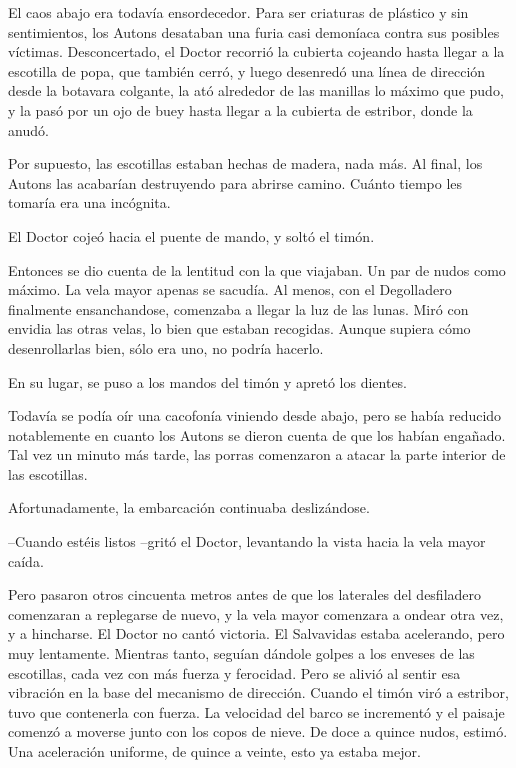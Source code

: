 El caos abajo era todavía ensordecedor. Para ser criaturas de plástico y sin sentimientos, los Autons desataban una furia casi demoníaca contra sus posibles víctimas. Desconcertado, el Doctor recorrió la cubierta cojeando hasta llegar a la escotilla de popa, que también cerró, y luego desenredó una línea de dirección desde la botavara colgante, la ató alrededor de las manillas lo máximo que pudo, y la pasó por un ojo de buey hasta llegar a la cubierta de estribor, donde la anudó.
 
Por supuesto, las escotillas estaban hechas de madera, nada más. Al final, los Autons las acabarían destruyendo para abrirse camino. Cuánto tiempo les tomaría era una incógnita.
 
El Doctor cojeó hacia el puente de mando, y soltó el timón.
 
Entonces se dio cuenta de la lentitud con la que viajaban. Un par de nudos como máximo. La vela mayor apenas se sacudía. Al menos, con el Degolladero finalmente ensanchandose, comenzaba a llegar la luz de las lunas. Miró con envidia las otras velas, lo bien que estaban recogidas. Aunque supiera cómo desenrollarlas bien, sólo era uno, no podría hacerlo.
 
En su lugar, se puso a los mandos del timón y apretó los dientes.
 
Todavía se podía oír una cacofonía viniendo desde abajo, pero se había reducido notablemente en cuanto los Autons se dieron cuenta de que los habían engañado. Tal vez un minuto más tarde, las porras comenzaron a atacar la parte interior de las escotillas.
 
Afortunadamente, la embarcación continuaba deslizándose.
 
--Cuando estéis listos --gritó el Doctor, levantando la vista hacia la vela mayor caída.
 
Pero pasaron otros cincuenta metros antes de que los laterales del desfiladero comenzaran a replegarse de nuevo, y la vela mayor comenzara a ondear otra vez, y a hincharse. El Doctor no cantó victoria. El Salvavidas estaba acelerando, pero muy lentamente. Mientras tanto, seguían dándole golpes a los enveses de las escotillas, cada vez con más fuerza y ferocidad. Pero se alivió al sentir esa vibración en la base del mecanismo de dirección. Cuando el timón viró a estribor, tuvo que contenerla con fuerza. La velocidad del barco se incrementó y el paisaje comenzó a moverse junto con los copos de nieve. De doce a quince nudos, estimó. Una aceleración uniforme, de quince a veinte, esto ya estaba mejor.
 
